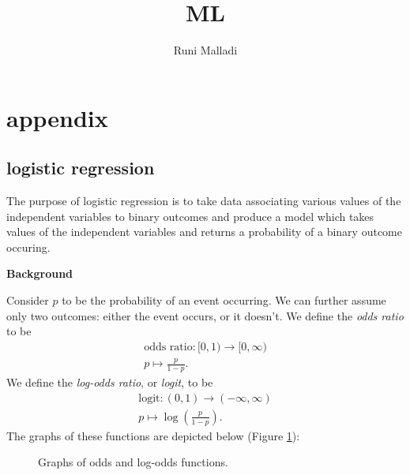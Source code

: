 \documentclass[12pt]{article}
\title{ML}
\author{Runi Malladi}
\begin{document}
\maketitle

\section{appendix} %

\subsection{logistic regression} %

The purpose of logistic regression is to take data associating various values of the independent variables to binary outcomes and produce a model which takes values of the independent variables and returns a probability of a binary outcome occuring.

\textbf{Background}

Consider $p$ to be the probability of an event occurring. We can further assume only two outcomes: either the event occurs, or it doesn't. We define the \emph{odds ratio} to be 
\begin{gather*}
	\text{odds ratio}: [0, 1) \to [0,\infty) \\
	p \mapsto \frac{p}{1-p}.
\end{gather*}
We define the \emph{log-odds ratio}, or \emph{logit}, to be 
\begin{gather*}
	\text{logit}: (0, 1) \to (-\infty, \infty) \\
	p \mapsto \log\left(\frac{p}{1-p}\right).
\end{gather*}
The graphs of these functions are depicted below (Figure \ref{fig_odds_logodds_graphs}):
\begin{figure}[h]
\centering
{}
\caption{Graphs of odds and log-odds functions.}
\label{fig_odds_logodds_graphs}
\end{figure}
\end{document}
